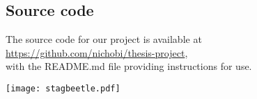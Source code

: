 \documentclass[nofilelist]{cslthse-msc}
\begin{document}
\begin{appendices} %
\chapter{Source code}
The source code for our project is available at \\\url{https://github.com/nichobi/thesis-project}, \\with the README.md file providing instructions for use.

\vspace*{\fill}
\hspace*{\fill}
\texttt{[image: stagbeetle.pdf]}

\printfilelist

\checkoddpage
\ifoddpage
\else
  \newpage
  \thispagestyle{empty}
  \mbox{ }
\fi

\end{appendices}
\end{document}
